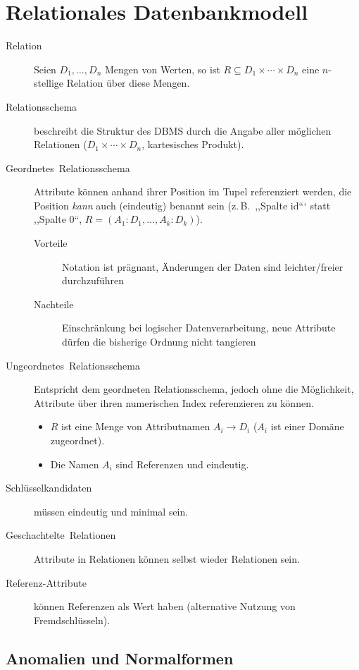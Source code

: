 \section{Relationales Datenbankmodell}
\begin{description}
\item [{Relation}] Seien $D_{1},\ldots,D_{n}$ Mengen von Werten, so ist
$R\subseteq D_{1}\times\cdots\times D_{n}$ eine $n$-stellige Relation
über diese Mengen.
\item [{Relationsschema}] beschreibt die Struktur des DBMS durch die Angabe
aller möglichen Relationen ($D_{1}\times\cdots\times D_{n}$, kartesisches
Produkt).
\item [{Geordnetes~Relationsschema}] Attribute können anhand ihrer Position
im Tupel referenziert werden, die Position \emph{kann} auch (eindeutig)
benannt sein (z.\,B.~,,Spalte \quotesinglbase id``` statt ,,Spalte
0``, $R=(A_{1}:D_{1},\ldots,A_{k}:D_{k})$).

\begin{description}
\item [{Vorteile}] Notation ist prägnant, Änderungen der Daten sind leichter\slash{}freier
durchzuführen
\item [{Nachteile}] Einschränkung bei logischer Datenverarbeitung, neue
Attribute dürfen die bisherige Ordnung nicht tangieren
\end{description}
\item [{Ungeordnetes~Relationsschema}] Entspricht dem geordneten Relationsschema,
jedoch ohne die Möglichkeit, Attribute über ihren numerischen Index
referenzieren zu können.

\begin{itemize}
\item $R$ ist eine Menge von Attributnamen $A_i \to D_i$ ($A_i$
ist einer Domäne zugeordnet).
\item Die Namen $A_{i}$ sind Referenzen und eindeutig.
\end{itemize}
\item [{Schlüsselkandidaten}] müssen eindeutig und minimal sein.
\item [{Geschachtelte~Relationen}] Attribute in Relationen können selbst
wieder Relationen sein.
\item [{Referenz-Attribute}] können Referenzen als Wert haben (alternative
Nutzung von Fremdschlüsseln).
\end{description}

\subsection{Anomalien und Normalformen}


